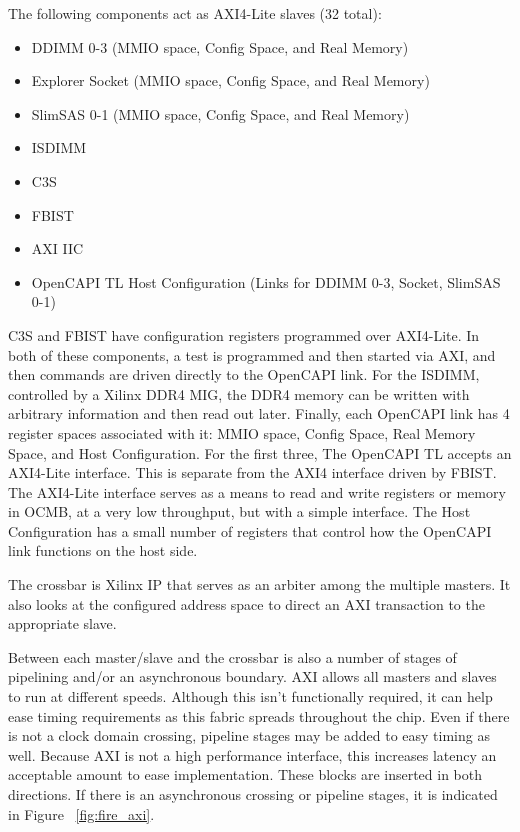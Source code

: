 The following components act as AXI4-Lite slaves (32 total):
\begin{itemize}
  \item DDIMM 0-3 (MMIO space, Config Space, and Real Memory)
  \item Explorer Socket (MMIO space, Config Space, and Real Memory)
  \item SlimSAS 0-1 (MMIO space, Config Space, and Real Memory)
  \item ISDIMM
  \item C3S
  \item FBIST
  \item AXI IIC
  \item OpenCAPI TL Host Configuration (Links for DDIMM 0-3, Socket, SlimSAS 0-1)
\end{itemize}
C3S and FBIST have configuration registers programmed over
AXI4-Lite. In both of these components, a test is programmed and then
started via AXI, and then commands are driven directly to the OpenCAPI
link. For the ISDIMM, controlled by a Xilinx DDR4 MIG, the DDR4 memory
can be written with arbitrary information and then read out
later. Finally, each OpenCAPI link has 4 register spaces associated
with it: MMIO space, Config Space, Real Memory Space, and Host
Configuration. For the first three, The OpenCAPI TL accepts an
AXI4-Lite interface. This is separate from the AXI4 interface driven
by FBIST. The AXI4-Lite interface serves as a means to read and write
registers or memory in OCMB, at a very low throughput, but with a
simple interface. The Host Configuration has a small number of
registers that control how the OpenCAPI link functions on the host
side.

The crossbar is Xilinx IP that serves as an arbiter among the multiple
masters. It also looks at the configured address space to direct an
AXI transaction to the appropriate slave.

Between each master/slave and the crossbar is also a number of stages
of pipelining and/or an asynchronous boundary. AXI allows all masters
and slaves to run at different speeds. Although this isn't
functionally required, it can help ease timing requirements as this
fabric spreads throughout the chip. Even if there is not a clock
domain crossing, pipeline stages may be added to easy timing as
well. Because AXI is not a high performance interface, this increases
latency an acceptable amount to ease implementation. These blocks are
inserted in both directions. If there is an asynchronous crossing or
pipeline stages, it is indicated in Figure ~\ref{fig:fire_axi}.

